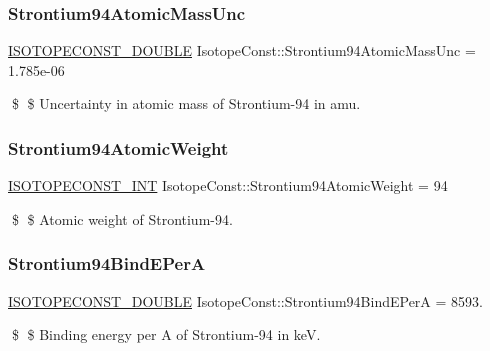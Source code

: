 \subsubsection{\texorpdfstring{Strontium94\+Atomic\+Mass\+Unc}{Strontium94AtomicMassUnc}}
{\footnotesize\ttfamily \mbox{\hyperlink{group___isotope_const-_macros_ga8f45a7272ce02c0b4c65c44636ed719a}{I\+S\+O\+T\+O\+P\+E\+C\+O\+N\+S\+T\+\_\+\+D\+O\+U\+B\+LE}} Isotope\+Const\+::\+Strontium94\+Atomic\+Mass\+Unc = 1.\+785e-\/06}

\$ \$ Uncertainty in atomic mass of Strontium-\/94 in amu. \mbox{\label{group___isotope_const-_strontium-_sr94_ga711e65859bb8a7590d2b8e96fceef40b}} 
\subsubsection{\texorpdfstring{Strontium94\+Atomic\+Weight}{Strontium94AtomicWeight}}
{\footnotesize\ttfamily \mbox{\hyperlink{group___isotope_const-_macros_ga5f18360b3e99483a35c32d789e62621c}{I\+S\+O\+T\+O\+P\+E\+C\+O\+N\+S\+T\+\_\+\+I\+NT}} Isotope\+Const\+::\+Strontium94\+Atomic\+Weight = 94}

\$ \$ Atomic weight of Strontium-\/94. \mbox{\label{group___isotope_const-_strontium-_sr94_ga214525bab2cc7c5c6e8ddb99d806a42b}} 
\subsubsection{\texorpdfstring{Strontium94\+Bind\+E\+PerA}{Strontium94BindEPerA}}
{\footnotesize\ttfamily \mbox{\hyperlink{group___isotope_const-_macros_ga8f45a7272ce02c0b4c65c44636ed719a}{I\+S\+O\+T\+O\+P\+E\+C\+O\+N\+S\+T\+\_\+\+D\+O\+U\+B\+LE}} Isotope\+Const\+::\+Strontium94\+Bind\+E\+PerA = 8593.}

\$ \$ Binding energy per A of Strontium-\/94 in keV. \mbox{\label{group___isotope_const-_strontium-_sr94_ga9e607c4299760cc7d42f832b21b875cf}} 
